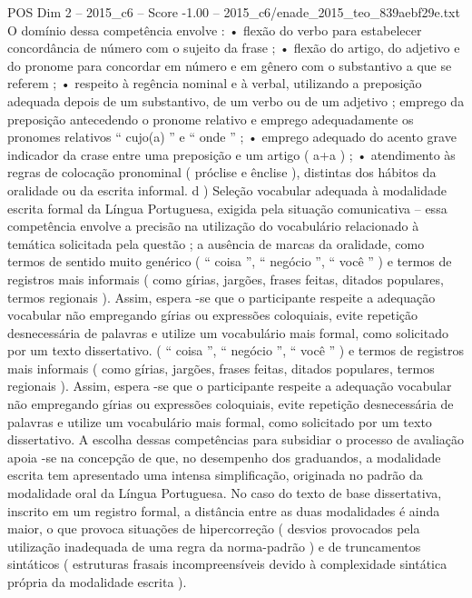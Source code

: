 \begin{textsample}{POS Dim 2 – 2015\_c6 – Score -1.00 – 2015\_c6/enade\_2015\_teo\_839aebf29e.txt}
O domínio dessa competência envolve : • flexão do verbo para estabelecer concordância de número com o sujeito da frase ; • flexão do artigo, do adjetivo e do pronome para concordar em número e em gênero com o substantivo a que se referem ; • respeito à regência nominal e à verbal, utilizando a preposição adequada depois de um substantivo, de um verbo ou de um adjetivo ; emprego da preposição antecedendo o pronome relativo e emprego adequadamente os pronomes relativos “ cujo(a) ” e “ onde ” ; • emprego adequado do acento grave indicador da crase entre uma preposição e um artigo ( a+a ) ; • atendimento às regras de colocação pronominal ( próclise e ênclise ), distintas dos hábitos da oralidade ou da escrita informal. d ) Seleção vocabular adequada à modalidade escrita formal da Língua Portuguesa, exigida pela situação comunicativa – essa competência envolve a precisão na utilização do vocabulário relacionado à temática solicitada pela questão ; a ausência de marcas da oralidade, como termos de sentido muito genérico ( “ coisa ”, “ negócio ”, “ você ” ) e termos de registros mais informais ( como gírias, jargões, frases feitas, ditados populares, termos regionais ).
Assim, espera -se que o participante respeite a adequação vocabular não empregando gírias ou expressões coloquiais, evite repetição desnecessária de palavras e utilize um vocabulário mais formal, como solicitado por um texto dissertativo. ( “ coisa ”, “ negócio ”, “ você ” ) e termos de registros mais informais ( como gírias, jargões, frases feitas, ditados populares, termos regionais ).
Assim, espera -se que o participante respeite a adequação vocabular não empregando gírias ou expressões coloquiais, evite repetição desnecessária de palavras e utilize um vocabulário mais formal, como solicitado por um texto dissertativo.
A escolha dessas competências para subsidiar o processo de avaliação apoia -se na concepção de que, no desempenho dos graduandos, a modalidade escrita tem apresentado uma intensa simplificação, originada no padrão da modalidade oral da Língua Portuguesa.
No caso do texto de base dissertativa, inscrito em um registro formal, a distância entre as duas modalidades é ainda maior, o que provoca situações de hipercorreção ( desvios provocados pela utilização inadequada de uma regra da norma-padrão ) e de truncamentos sintáticos ( estruturas frasais incompreensíveis devido à complexidade sintática própria da modalidade escrita ).

\end{textsample}
